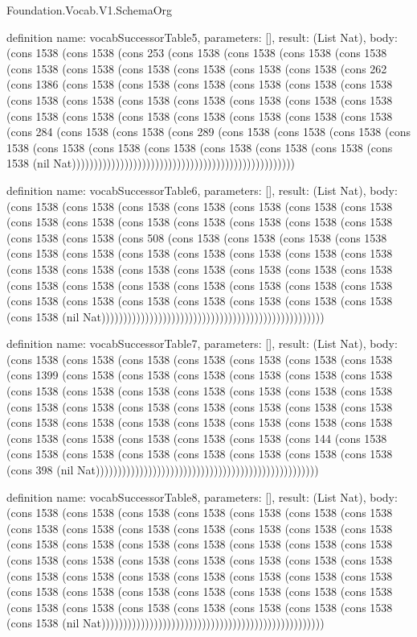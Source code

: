 \begin{lexlean}{Foundation.Vocab.V1.SchemaOrg}
\begin{semanticmodule}
definition{
  name: vocabSuccessorTable5,
  parameters: [],
  result: (List Nat),
  body: (cons 1538 (cons 1538 (cons 253 (cons 1538 (cons 1538 (cons 1538 (cons 1538 (cons 1538 (cons 1538 (cons 1538 (cons 1538 (cons 1538 (cons 1538 (cons 262 (cons 1386 (cons 1538 (cons 1538 (cons 1538 (cons 1538 (cons 1538 (cons 1538 (cons 1538 (cons 1538 (cons 1538 (cons 1538 (cons 1538 (cons 1538 (cons 1538 (cons 1538 (cons 1538 (cons 1538 (cons 1538 (cons 1538 (cons 1538 (cons 1538 (cons 284 (cons 1538 (cons 1538 (cons 289 (cons 1538 (cons 1538 (cons 1538 (cons 1538 (cons 1538 (cons 1538 (cons 1538 (cons 1538 (cons 1538 (cons 1538 (cons 1538 (nil Nat)))))))))))))))))))))))))))))))))))))))))))))))))))
}

definition{
  name: vocabSuccessorTable6,
  parameters: [],
  result: (List Nat),
  body: (cons 1538 (cons 1538 (cons 1538 (cons 1538 (cons 1538 (cons 1538 (cons 1538 (cons 1538 (cons 1538 (cons 1538 (cons 1538 (cons 1538 (cons 1538 (cons 1538 (cons 1538 (cons 1538 (cons 508 (cons 1538 (cons 1538 (cons 1538 (cons 1538 (cons 1538 (cons 1538 (cons 1538 (cons 1538 (cons 1538 (cons 1538 (cons 1538 (cons 1538 (cons 1538 (cons 1538 (cons 1538 (cons 1538 (cons 1538 (cons 1538 (cons 1538 (cons 1538 (cons 1538 (cons 1538 (cons 1538 (cons 1538 (cons 1538 (cons 1538 (cons 1538 (cons 1538 (cons 1538 (cons 1538 (cons 1538 (cons 1538 (cons 1538 (nil Nat)))))))))))))))))))))))))))))))))))))))))))))))))))
}

definition{
  name: vocabSuccessorTable7,
  parameters: [],
  result: (List Nat),
  body: (cons 1538 (cons 1538 (cons 1538 (cons 1538 (cons 1538 (cons 1538 (cons 1538 (cons 1399 (cons 1538 (cons 1538 (cons 1538 (cons 1538 (cons 1538 (cons 1538 (cons 1538 (cons 1538 (cons 1538 (cons 1538 (cons 1538 (cons 1538 (cons 1538 (cons 1538 (cons 1538 (cons 1538 (cons 1538 (cons 1538 (cons 1538 (cons 1538 (cons 1538 (cons 1538 (cons 1538 (cons 1538 (cons 1538 (cons 1538 (cons 1538 (cons 1538 (cons 1538 (cons 1538 (cons 1538 (cons 1538 (cons 144 (cons 1538 (cons 1538 (cons 1538 (cons 1538 (cons 1538 (cons 1538 (cons 1538 (cons 1538 (cons 398 (nil Nat)))))))))))))))))))))))))))))))))))))))))))))))))))
}

definition{
  name: vocabSuccessorTable8,
  parameters: [],
  result: (List Nat),
  body: (cons 1538 (cons 1538 (cons 1538 (cons 1538 (cons 1538 (cons 1538 (cons 1538 (cons 1538 (cons 1538 (cons 1538 (cons 1538 (cons 1538 (cons 1538 (cons 1538 (cons 1538 (cons 1538 (cons 1538 (cons 1538 (cons 1538 (cons 1538 (cons 1538 (cons 1538 (cons 1538 (cons 1538 (cons 1538 (cons 1538 (cons 1538 (cons 1538 (cons 1538 (cons 1538 (cons 1538 (cons 1538 (cons 1538 (cons 1538 (cons 1538 (cons 1538 (cons 1538 (cons 1538 (cons 1538 (cons 1538 (cons 1538 (cons 1538 (cons 1538 (cons 1538 (cons 1538 (cons 1538 (cons 1538 (cons 1538 (cons 1538 (cons 1538 (nil Nat)))))))))))))))))))))))))))))))))))))))))))))))))))
}


\end{semanticmodule}
\end{lexlean}
